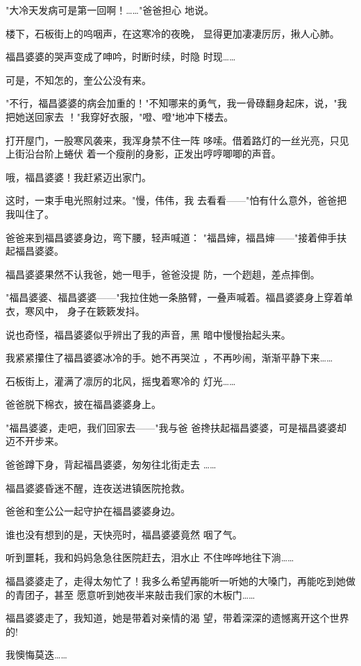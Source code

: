 \documentclass{article}
\begin{document}
"大冷天发病可是第一回啊！……"爸爸担心
地说。 

楼下，石板街上的呜咽声，在这寒冷的夜晚，
显得更加凄凄厉厉，揪人心肺。 

福昌婆婆的哭声变成了呻吟，时断时续，时隐
时现…… 


可是，不知怎的，奎公公没有来。 

"不行，福昌婆婆的病会加重的！"不知哪来的勇气，我一骨碌翻身起床，说，"我把她送回家去
！"我穿好衣服，"噔、噔"地冲下楼去。 

打开屋门，一股寒风袭来，我浑身禁不住一阵
\newpage
哆嗦。借着路灯的一丝光亮，只见上街沿台阶上蜷伏
着一个瘦削的身影，正发出哼哼唧唧的声音。 


哦，福昌婆婆！我赶紧迈出家门。 

这时，一束手电光照射过来。"慢，伟伟，我
去看看——"怕有什么意外，爸爸把我叫住了。 

爸爸来到福昌婆婆身边，弯下腰，轻声喊道：
"福昌婶，福昌婶——"接着伸手扶起福昌婆婆。 

福昌婆婆果然不认我爸，她一甩手，爸爸没提
防，一个趔趄，差点摔倒。 

"福昌婆婆、福昌婆婆——"我拉住她一条胳臂，一叠声喊着。福昌婆婆身上穿着单衣，寒风中，
身子在簌簌发抖。 

说也奇怪，福昌婆婆似乎辨出了我的声音，黑
暗中慢慢抬起头来。 

\newpage

我紧紧攥住了福昌婆婆冰冷的手。她不再哭泣
，不再吵闹，渐渐平静下来…… 

石板街上，灌满了凛厉的北风，摇曳着寒冷的
灯光…… 


爸爸脱下棉衣，披在福昌婆婆身上。 

"福昌婆婆，走吧，我们回家去——"我与爸
爸搀扶起福昌婆婆，可是福昌婆婆却迈不开步来。 

爸爸蹲下身，背起福昌婆婆，匆匆往北街走去
…… 


福昌婆婆昏迷不醒，连夜送进镇医院抢救。 


爸爸和奎公公一起守护在福昌婆婆身边。 

谁也没有想到的是，天快亮时，福昌婆婆竟然
咽了气。 

\newpage

听到噩耗，我和妈妈急急往医院赶去，泪水止
不住哗哗地往下淌…… 

福昌婆婆走了，走得太匆忙了！我多么希望再能听一听她的大嗓门，再能吃到她做的青团子，甚至
愿意听到她夜半来敲击我们家的木板门…… 

福昌婆婆走了，我知道，她是带着对亲情的渴
望，带着深深的遗憾离开这个世界的! 

我懊悔莫迭……
\end{document}
